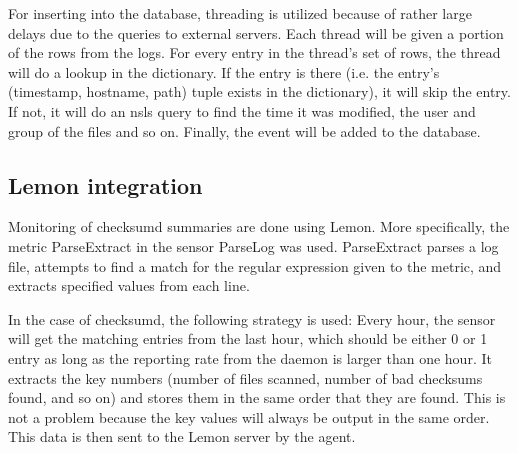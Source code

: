 For inserting into the database, threading is utilized because of rather large delays due to the queries to external servers. Each thread will be given a portion of the rows from the logs. For every entry in the thread's set of rows, the thread will do a lookup in the dictionary. If the entry is there (i.e. the entry's (timestamp, hostname, path) tuple exists in the dictionary), it will skip the entry. If not, it will do an nsls query to find the time it was modified, the user and group of the files and so on. Finally, the event will be added to the database.

\subsection{Lemon integration}
\label{sec:lemon_integration}
Monitoring of checksumd summaries are done using Lemon. More specifically, the metric ParseExtract in the sensor ParseLog was used. ParseExtract parses a log file, attempts to find a match for the regular expression given to the metric, and extracts specified values from each line. 

In the case of checksumd, the following strategy is used: Every hour, the sensor will get the matching entries from the last hour, which should be either 0 or 1 entry as long as the reporting rate from the daemon is larger than one hour. It extracts the key numbers (number of files scanned, number of bad checksums found, and so on) and stores them in the same order that they are found. This is not a problem because the key values will always be output in the same order. This data is then sent to the Lemon server by the agent.
